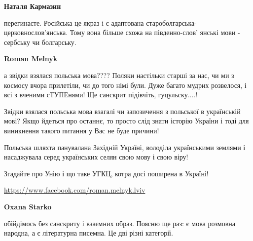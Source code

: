 \begin{itemize}
\begin{itemize}
 
\textbf{Наталя Кармазин} 

перегинаєте. Російська це якраз і є адаптована
староболгарська-церковнослов'янська. Тому вона більше схожа на південно-слов'
янські мови - сербську чи болгарську.



 
\textbf{Roman Melnyk} 

а звідки взялася польська мова???? Поляки настільки старші за нас, чи ми з
космосу вчора прилетіли, чи до того німі були. Дуже багато мудрих розвелося, і
всі з вченими сТУПЕнями! Ще санскрит підівчіть, гуцульску....!

 

Звідки взялася польська мова взагалі чи запозичення з польської в українській
мові? Якщо йдеться про останнє, то просто слід знати історію України і тоді для
виникнення такого питання у Вас не буде причини! 

Польська шляхта панувалана Західній Україні, володіла українськими землями і
насаджувала серед українських селян свою мову і свою віру! 

Згадайте про Унію і що таке УГКЦ, котра досі поширена в Україні!

\url{https://www.facebook.com/roman.melnyk.lviv}\par
 
\textbf{Oxana Starko} 

обійдімось без санскриту і взаємних образ. Поясню ще раз: є мова розмовна
народна, а є літературна писемна. Це дві різні категорії.


\end{itemize}
\end{itemize}
